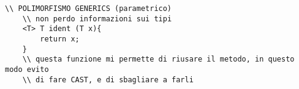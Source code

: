 \begin{lstlisting}[basicstyle=\small,]
	\\ POLIMORFISMO GENERICS (parametrico)
	\\ non perdo informazioni sui tipi
	<T> T ident (T x){
		return x;
	}
	\\ questa funzione mi permette di riusare il metodo, in questo modo evito 
	\\ di fare CAST, e di sbagliare a farli

\end{lstlisting}

 



\newpage

